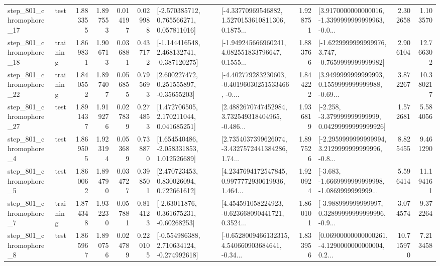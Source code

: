 \begin{tabular}{llrrrrllrlrr}
  step\_801\_chromophore\_17 &      test &      1.883355 &    1.897553 &      0.014197 &  0.029988 &    [-2.570385712, 0.765566271, 0.057811016] &  [-4.33770969546882, 1.5270153610811306, 0.1875... &       1.928751 &  [3.9170000000000016, -1.3399999999999963, -0.0... &            2.302658 &          1.103570 \\
  step\_801\_chromophore\_18 &  training &      1.869831 &    1.906713 &      0.036881 &  0.437172 &   [-1.144416548, 2.468132741, -0.387120275] &  [-1.949245666960241, 4.082551833796647, 0.1555... &       1.883766 &  [-1.6229999999999976, 3.747, -0.7659999999999982] &            2.906104 &         12.766302 \\
  step\_801\_chromophore\_22 &  training &      1.840552 &    1.897407 &      0.056855 &  0.795693 &     [2.600227472, 0.251555897, -0.35655203] &  [-4.402779283230603, -0.40196030251533466, -0.... &       1.844222 &  [3.9499999999999993, 0.1559999999999988, -0.69... &            3.872267 &         10.380217 \\
  step\_801\_chromophore\_27 &      test &      1.891437 &    1.919276 &      0.027839 &  0.274853 &     [1.472706505, 2.170211044, 0.041685251] &  [2.4882670747452984, 3.732549318404965, -0.486... &       1.936819 &  [-2.258, -3.379999999999999, 0.04299999999999926] &            1.572681 &          5.584056 \\
   step\_801\_chromophore\_4 &      test &      1.869505 &    1.923194 &      0.053689 &  0.738870 &    [1.654540486, -2.058331853, 1.012526689] &  [2.7354037399626074, -3.4327572441384286, 1.74... &       1.897526 &  [-2.2959999999999994, 3.2129999999999996, -0.8... &            8.825455 &          9.461290 \\
   step\_801\_chromophore\_5 &      test &      1.860062 &    1.894790 &      0.034727 &  0.398501 &     [2.470723453, 0.830026094, 0.722661612] &  [4.2347694172547845, 0.9977772930619936, 1.464... &       1.920924 &  [-3.683, -1.6669999999999998, -1.0869999999999... &            5.596414 &         11.194161 \\
   step\_801\_chromophore\_7 &  training &      1.874348 &    1.932230 &      0.057881 &  0.814123 &     [-2.63011876, 0.361675231, -0.60268253] &  [4.454591058224923, -0.623668090441721, 0.3524... &       1.860101 &  [-3.988999999999997, 0.32899999999999996, -0.9... &            3.074574 &          9.372264 \\
   step\_801\_chromophore\_8 &      test &      1.865967 &    1.890756 &      0.024789 &  0.220105 &   [-0.554986388, 2.710634124, -0.274992618] &  [-0.6528009466132315, 4.540660903684641, -0.34... &       1.833956 &  [0.06900000000000261, -4.1290000000000004, 0.2... &           10.715970 &          7.213458 \\

\end{tabular}
